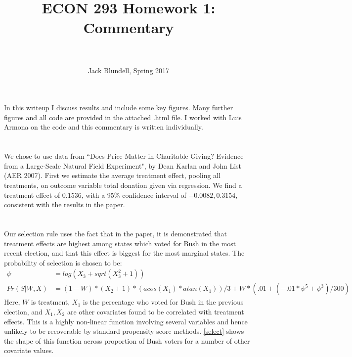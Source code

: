 \documentclass[paper=letter, fontsize=11pt]{scrartcl} %
\title{	
\normalfont \normalsize 
\horrule{0.5pt} \\[0.4cm] %
 \large{{\textbf{ECON 293 Homework 1: Commentary}}} \\ %
\horrule{2pt} \\[0.5cm] %
}
\author{\small{Jack Blundell, Spring 2017}} %
\date{} %
\begin{document}
\maketitle %

In this writeup I discuss results and include some key figures. Many further figures and all code are provided in the attached .html file. I worked with Luis Armona on the code and this commentary is written individually.

\section{}

We chose to use data from ``Does Price Matter in Charitable Giving?
Evidence from a Large-Scale Natural Field Experiment", by Dean Karlan and John List (AER 2007). First we estimate the average treatment effect, pooling all treatments, on outcome variable total donation given via regression. We find a treatment effect of $0.1536$, with a 95\% confidence interval of $-0.0082, 0.3154 $, consistent with the results in the paper.

\section{}

Our selection rule uses the fact that in the paper, it is demonstrated that treatment effects are highest among states which voted for Bush in the most recent election, and that this effect is biggest for the most marginal states. The probability of selection is chosen to be:
\begin{align*}
  \psi &= log(X_3 + sqrt(X_3 ^ 2 + 1)) \\
Pr(S|W,X) &= (1-W)*(X_2+1)*(acos(X_1)*atan(X_1) )/3 + 
      W*(.01+(-.01*\psi^5 + \psi^3)/300)
\end{align*}
Here, $W$ is treatment, $X_1$ is the percentage who voted for Bush in the previous election, and $X_1,X_2$ are other covariates found to be correlated with treatment effects. This is a highly non-linear function involving several variables and hence unlikely to be recoverable by standard propensity score methods. \ref{select} shows the shape of this function across proportion of Bush voters for a number of other covariate values.
\end{document}
